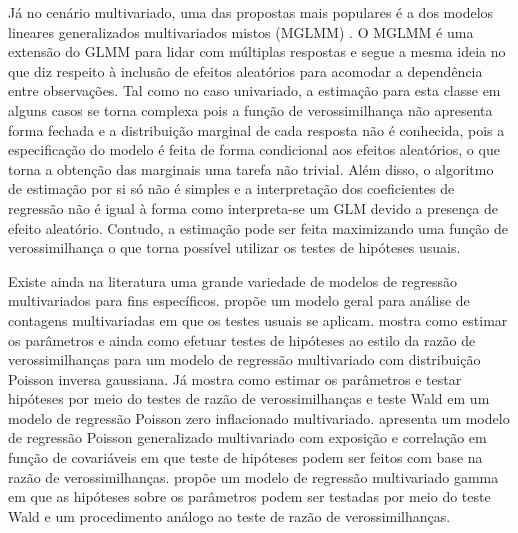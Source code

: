 Já no cenário multivariado, uma das propostas mais populares é a dos modelos lineares generalizados multivariados mistos (MGLMM) \citep{berridge2019multivariate}. O MGLMM é uma extensão do GLMM para lidar com múltiplas respostas e segue a mesma ideia no que diz respeito à inclusão de efeitos aleatórios para acomodar a dependência entre observações. Tal como no caso univariado, a estimação para esta classe em alguns casos se torna complexa pois a função de verossimilhança não apresenta forma fechada e a distribuição marginal de cada resposta não é conhecida, pois a especificação do modelo é feita de forma condicional aos efeitos aleatórios, o que torna a obtenção das marginais uma tarefa não trivial. Além disso, o algoritmo de estimação por si só não é simples e a interpretação dos coeficientes de regressão não é igual à forma como interpreta-se um GLM devido a presença de efeito aleatório. Contudo, a estimação pode ser feita maximizando uma função de verossimilhança o que torna possível utilizar os testes de hipóteses usuais. 


Existe ainda na literatura uma grande variedade de modelos de regressão multivariados para fins específicos. \citet{zhang2017regression} propõe um modelo geral para análise de contagens multivariadas em que os testes usuais se aplicam. \citet{mardalena2020parameter} mostra como estimar os parâmetros e ainda como efetuar testes de hipóteses ao estilo da razão de verossimilhanças para um modelo de regressão multivariado com distribuição Poisson inversa gaussiana. Já \citet{sari2021estimation} mostra como estimar os parâmetros e testar hipóteses por meio do testes de razão de verossimilhanças e teste Wald em um modelo de regressão Poisson zero inflacionado multivariado. \citet{berliana2019multivariate} apresenta um modelo de regressão Poisson generalizado multivariado com exposição e correlação em função de covariáveis em que teste de hipóteses podem ser feitos com base na razão de verossimilhanças. \citet{rahayu2020multivariate} propõe um modelo de regressão multivariado gamma em que as hipóteses sobre os parâmetros podem ser testadas por meio do teste Wald e um procedimento análogo ao teste de razão de verossimilhanças.

